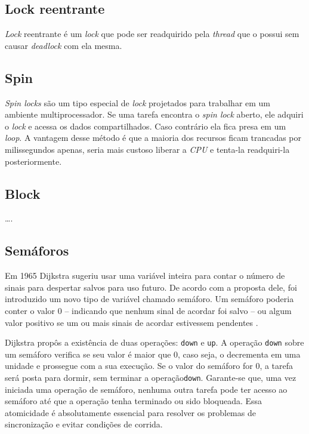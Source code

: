 \subsection{Lock reentrante}

\textit{Lock} reentrante é um \textit{lock} que pode ser readquirido pela
\textit{thread} que o possui sem causar \textit{deadlock} com ela mesma.

\subsection{Spin}

\textit{Spin locks} são um tipo especial de \textit{lock} projetados
para trabalhar em um ambiente multiprocessador. Se uma tarefa encontra
o \textit{spin lock} aberto, ele adquiri o \textit{lock} e acessa os
dados compartilhados.  Caso contrário ela fica presa em um {\it loop}.
A vantagem desse método é que a maioria dos recursos ficam trancadas por
milissegundos apenas, seria mais custoso liberar a \textit{CPU} e tenta-la
readquiri-la posteriormente.

\subsection{Block}
….


\subsection{Semáforos}

Em 1965 Dijkstra sugeriu usar uma variável inteira para contar o número de
sinais para despertar salvos para uso futuro.  De acordo com a proposta dele,
foi introduzido um novo tipo de variável chamado semáforo. Um semáforo
poderia conter o valor 0 – indicando que nenhum sinal de acordar foi
salvo – ou algum valor positivo se um ou mais sinais de acordar estivessem
pendentes \cite{TANE}.

Dijkstra propôs a existência de duas operações: \texttt{down} e
\texttt{up}. A operação \texttt{down} sobre um semáforo verifica se seu
valor é maior que 0, caso seja, o decrementa em uma unidade e prossegue
com a sua execução.  Se o valor do semáforo for 0, a tarefa será posta
para dormir, sem terminar a operação\texttt{down}. Garante-se que, uma vez
iniciada uma operação de semáforo, nenhuma outra tarefa pode ter acesso
ao semáforo até que a operação tenha terminado ou sido bloqueada. Essa
atomicidade é absolutamente essencial para resolver os problemas de
sincronização e evitar condições de corrida.

